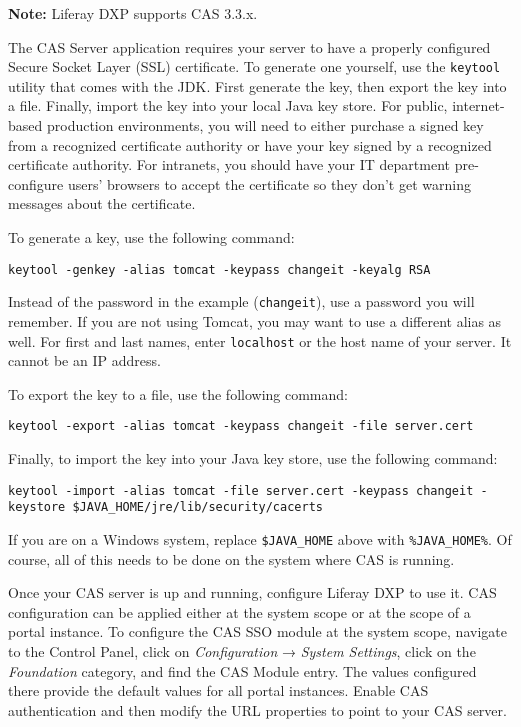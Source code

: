 \noindent\hrulefill

\textbf{Note:} Liferay DXP supports CAS 3.3.x.

\noindent\hrulefill

The CAS Server application requires your server to have a properly
configured Secure Socket Layer (SSL) certificate. To generate one
yourself, use the \texttt{keytool} utility that comes with the JDK.
First generate the key, then export the key into a file. Finally, import
the key into your local Java key store. For public, internet-based
production environments, you will need to either purchase a signed key
from a recognized certificate authority or have your key signed by a
recognized certificate authority. For intranets, you should have your IT
department pre-configure users' browsers to accept the certificate so
they don't get warning messages about the certificate.

To generate a key, use the following command:

\begin{verbatim}
keytool -genkey -alias tomcat -keypass changeit -keyalg RSA
\end{verbatim}

Instead of the password in the example (\texttt{changeit}), use a
password you will remember. If you are not using Tomcat, you may want to
use a different alias as well. For first and last names, enter
\texttt{localhost} or the host name of your server. It cannot be an IP
address.

To export the key to a file, use the following command:

\begin{verbatim}
keytool -export -alias tomcat -keypass changeit -file server.cert
\end{verbatim}

Finally, to import the key into your Java key store, use the following
command:

\begin{verbatim}
keytool -import -alias tomcat -file server.cert -keypass changeit -keystore $JAVA_HOME/jre/lib/security/cacerts
\end{verbatim}

If you are on a Windows system, replace \texttt{\$JAVA\_HOME} above with
\texttt{\%JAVA\_HOME\%}. Of course, all of this needs to be done on the
system where CAS is running.

Once your CAS server is up and running, configure Liferay DXP to use it.
CAS configuration can be applied either at the system scope or at the
scope of a portal instance. To configure the CAS SSO module at the
system scope, navigate to the Control Panel, click on
\emph{Configuration} → \emph{System Settings}, click on the
\emph{Foundation} category, and find the CAS Module entry. The values
configured there provide the default values for all portal instances.
Enable CAS authentication and then modify the URL properties to point to
your CAS server.

